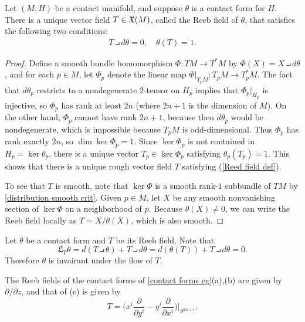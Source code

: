 \begin{theorem}
Let $(M,H)$ be a contact manifold, and suppose $\theta$ is a contact form for $H$. There is a unique vector field $T\in\mathfrak{X}(M)$, called the Reeb field of $\theta$, that satisfies the following two conditions:
\begin{align}\label{Reed field def}
T\intprod d\theta=0,\quad\theta(T)=1.
\end{align}
\end{theorem}
\begin{proof}
Define a smooth bundle homomorphism $\varPhi:TM\to T^*M$ by $\varPhi(X)=X\intprod d\theta$, and for each $p\in M$, let $\varPhi_p$ denote the linear map $\varPhi|_{T_pM}:T_pM\to T^*_pM$. The fact that $d\theta_p$ restricts to a nondegenerate $2$-tensor on $H_p$ implies that $\varPhi_p|_{H_p}$ is injective, so $\varPhi_p$ has rank at least $2n$ (where $2n+1$ is the dimension of $M$). On the other hand, $\varPhi_p$ cannot have rank $2n+1$, because then $d\theta_p$ would be nondegenerate, which is impossible because $T_pM$ is odd-dimensional. Thus $\varPhi_p$ has rank exactly $2n$, so $\dim\ker\varPhi_p=1$. Since $\ker\varPhi_p$ is not contained in $H_p=\ker\theta_p$, there is a unique vector $T_p\in\ker\varPhi_p$ satisfying $\theta_p(T_p)=1$. This shows that there is a unique rough vector field $T$ satisfying (\ref{Reed field def}).\par
To see that $T$ is smooth, note that $\ker\varPhi$ is a smooth rank-$1$ subbundle of $TM$ by \cref{distribution smooth crit}. Given $p\in M$, let $X$ be any smooth nonvanishing section of $\ker\varPhi$ on a neighborhood of $p$. Because $\theta(X)\neq 0$, we can write the Reeb field locally as $T=X/\theta(X)$, which is also smooth.
\end{proof}

\begin{remark}
Let $\theta$ be a contact form and $T$ be its Reeb field. Note that
\[\mathfrak{L}_{T}\theta=d(T\intprod\theta)+T\intprod d\theta=d(\theta(T))+T\intprod d\theta=0.\]
Therefore $\theta$ is invairant under the flow of $T$.
\end{remark}

\begin{example}
The Reeb fields of the contact forms of \cref{contact forms eg}(a),(b) are given by $\partial/\partial z$, and that of (c) is given by
\[T=\Big(x^i\frac{\partial}{\partial y^i}-y^i\frac{\partial}{\partial x^i}\Big)\Big|_{S^{2n+1}}.\]
\end{example}

